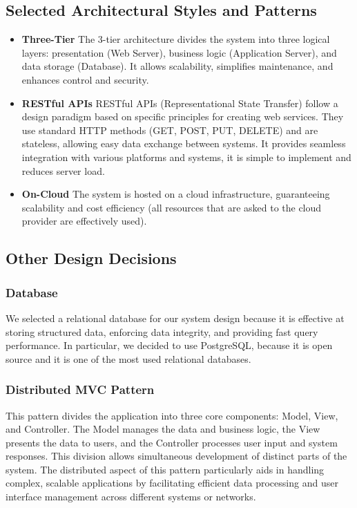 \documentclass[a4paper,12pt]{article}
\begin{document}
\subsection{Selected Architectural Styles and Patterns}
\begin{itemize}
    \item \textbf{Three-Tier} The 3-tier architecture divides the system into three logical layers: presentation (Web Server), business logic (Application Server), and data storage (Database). It allows scalability, simplifies maintenance, and enhances control and security.

    \item \textbf{RESTful APIs} RESTful APIs (Representational State Transfer) follow a design paradigm based on specific principles for creating web services. They use standard HTTP methods (GET, POST, PUT, DELETE) and are stateless, allowing easy data exchange between systems. It provides seamless integration with various platforms and systems, it is simple to implement and reduces server load.

    \item \textbf{On-Cloud} The system is hosted on a cloud infrastructure, guaranteeing scalability and cost efficiency (all resources that are asked to the cloud provider are effectively used).
\end{itemize}

\subsection{Other Design Decisions}
\subsubsection{Database}
We selected a relational database for our system design because it is effective at storing structured data, enforcing data integrity, and providing fast query performance. In particular, we decided to use PostgreSQL, because it is open source and it is one of the most used relational databases.
\subsubsection{Distributed MVC Pattern}
This pattern divides the application into three
core components: Model, View, and Controller. The Model manages the data and business
logic, the View presents the data to users, and the Controller processes user input and system responses. This division allows simultaneous development of distinct parts of the system. The
distributed aspect of this pattern particularly aids in handling complex, scalable applications
by facilitating efficient data processing and user interface management across different systems
or networks.
\end{document}
